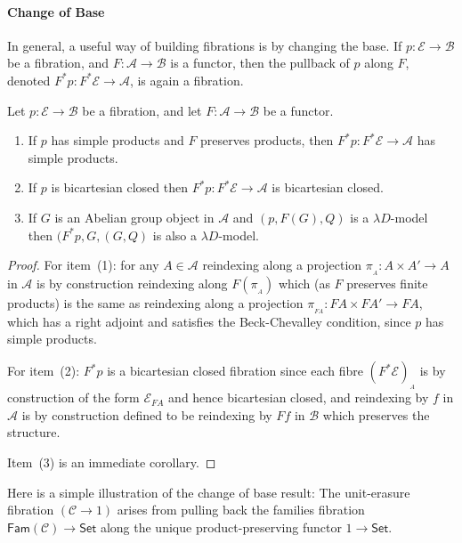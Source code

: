 \documentclass[a4paper,UKenglish]{lipics}
\newcommand{\ra}{\rightarrow}
\newcommand{\msf}[1]{\mathsf{#1}} %
\newcommand{\Set}{\msf{Set}}
\newcommand{\Fam}[1]{\msf{Fam}(#1)}
\newcommand{\A}{\mathcal{A}}
\newcommand{\B}{\mathcal{B}}
\newcommand{\C}{\mathcal{C}}
\newcommand{\E}{\mathcal{E}}
\newcommand{\fibre}[2]{#1_{_{#2}}}
\newcommand{\fibreE}[1]{\E_{#1}}
\begin{document}
\paragraph*{Change of Base}
\label{sec:change-of-base}
In general, a useful way of building fibrations is by changing the base.
If $p:\E\ra \B$ be a fibration,
and $F:\A\ra \B$ is a functor,
then the pullback of $p$ along $F$,
denoted
$F^\ast p : F^\ast \E \rightarrow \A$,
is again a fibration.
\begin{theorem}
\label{thm:change-of-base}
Let $p:\E\ra \B$ be a fibration,
and let $F:\A\ra \B$ be a functor.
\begin{enumerate}
\item If $p$ has simple products and $F$ preserves products,
then $F^\ast p : F^\ast \E \rightarrow \A$ has simple products.
\item If $p$ is bicartesian closed then $F^\ast p: F^\ast \E \rightarrow \A$
is bicartesian closed.
\item If $G$ is an Abelian group object in $\A$ and
  $(p,F(G),Q)$ is a $\lambda D$-model
  then $(F^\ast p,G,(G,Q)$ is also a $\lambda D$-model.
\end{enumerate}
\end{theorem}
\begin{proof}
For item~(1): for any $A \in \A$ reindexing along a projection $\pi_{_{A}}: A \times A' \rightarrow A$ in $\A$ is by construction reindexing along $F(\pi_{_{A}})$ which (as $F$ preserves finite products) is the same as reindexing along a projection $\pi_{_{FA}} : FA \times FA' \rightarrow FA$, which has a right adjoint and satisfies the Beck-Chevalley condition, since $p$ has simple products.

For item~(2): $F^*p$ is a bicartesian closed fibration since each fibre $\fibre{(F^*\E)}{A}$ is by construction of the form $\fibreE{FA}$ and hence bicartesian closed, and reindexing by $f$ in $\A$ is by construction defined to be reindexing by $Ff$ in $\B$ which preserves the structure.

Item~(3) is an immediate corollary.
\end{proof}


Here is a simple illustration of the change of base result:
The unit-erasure fibration $(\C\to 1)$ arises from pulling back the families fibration
$\Fam\C\to\Set$ along the unique product-preserving functor $1\to\Set$.
\end{document}
